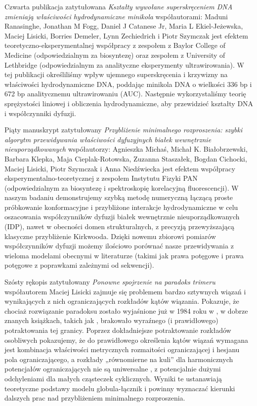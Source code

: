 \documentclass{doctoral}
\begin{document}
{Czwarta publikacja zatytułowana \emph{Kształty wywołane superskręceniem DNA zmieniają właściwości hydrodynamiczne minikola}
współautorami: Maduni Ranasinghe, Jonathan M Fogg, Daniel J Catanese Jr, Maria L Ekiel-Jeżewska, Maciej Lisicki, Borries Demeler, Lynn Zechiedrich i Piotr Szymczak
jest efektem teoretyczno-eksperymentalnej współpracy z zespołem z Baylor College of Medicine (odpowiedzialnym za biosyntezę) oraz zespołem z University of Lethbridge (odpowiedzialnym za analityczne eksperymenty ultrawirowania).
W tej publikacji określiliśmy wpływ ujemnego superskręcenia i krzywizny na właściwości hydrodynamiczne DNA, poddając minikola DNA o wielkości 336 bp i 672 bp analitycznemu ultrawirowaniu (AUC). Następnie wykorzystaliśmy teorię sprężystości liniowej i obliczenia hydrodynamiczne, aby przewidzieć kształty DNA i współczynniki dyfuzji.

Piąty manuskrypt zatytułowany \emph{Przybliżenie minimalnego rozproszenia: szybki algorytm przewidywania właściwości dyfuzyjnych białek wewnętrznie nieuporządkowanych}
współautorzy: Agnieszka Michaś, Michał K. Białobrzewski, Barbara Klepka, Maja Cieplak-Rotowska, Zuzanna Staszałek, Bogdan Cichocki, Maciej Lisicki, Piotr Szymczak i Anna Niedźwiecka
jest efektem współpracy eksperymentalno-teoretycznej z zespołem Instytutu Fizyki PAN (odpowiedzialnym za biosyntezę i spektroskopię korelacyjną fluorescencji).
W naszym badaniu demonstrujemy szybką metodę numeryczną łączącą proste próbkowanie konformacyjne i przybliżone interakcje hydrodynamiczne w celu oszacowania współczynników dyfuzji białek wewnętrznie nieuporządkowanych (IDP), nawet w obecności domen strukturalnych, z precyzją przewyższającą klasyczne przybliżenie Kirkwooda. Dzięki nowemu zbiorowi pomiarów współczynników dyfuzji możemy ilościowo porównać nasze przewidywania z wieloma modelami obecnymi w literaturze (takimi jak prawa potęgowe i prawa potęgowe z poprawkami zależnymi od sekwencji).

Szósty rękopis zatytułowany \emph{Ponowne spojrzenie na paradoks trimeru}
współautorem Maciej Lisicki
zajmuje się problemem bardzo sztywnych wiązań i wynikających z nich ograniczających rozkładów kątów wiązania. Pokazuje, że chociaż rozwiązanie paradoksu zostało wyjaśnione już w 1984 roku w \textcite{van_Kampen_1984}, w dobrze znanych książkach, takich jak \textcite{Frenkel_2002}, brakowało wyraźnego (i prawidłowego) potraktowania tej granicy. Poprzez dokładniejsze potraktowanie rozkładów osobliwych pokazujemy, że do prawidłowego określenia kątów wiązań wymagana jest kombinacja właściwości metrycznych rozmaitości ograniczającej i hesjanu pola ograniczającego, a rozkłady „równomierne na kuli” dla harmonicznych potencjałów ograniczających nie są uniwersalne , z potencjalnie dużymi odchyleniami dla małych cząsteczek cyklicznych. Wyniki te ustanawiają teoretyczne podstawy modelu globula-łącznik i powinny wyznaczać kierunki dalszych prac nad przybliżeniem minimalnego rozproszenia.

}
\end{document}
